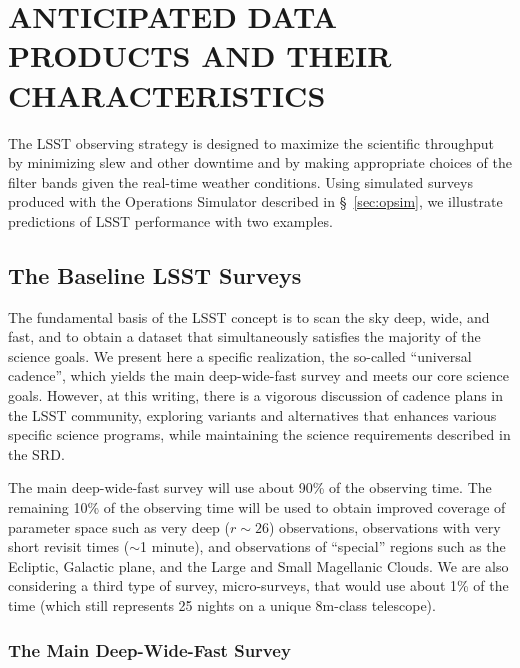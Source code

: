 \section{  ANTICIPATED DATA PRODUCTS AND THEIR CHARACTERISTICS    }
\label{Sec:dataprod}

The LSST observing strategy is designed to maximize the scientific
throughput by minimizing slew and other downtime and by making appropriate
choices of the filter bands given the real-time weather conditions.
Using simulated surveys produced with the Operations Simulator described in \S~\ref{sec:opsim},
we illustrate predictions of LSST performance with two examples.


\subsection{ The Baseline LSST Surveys }
\label{sec:baseline}

The fundamental basis of the LSST concept is to scan the sky deep, wide, and
fast, and to obtain a dataset that simultaneously satisfies the majority
of the science goals. We present here a specific realization, the
so-called ``universal cadence'', which yields the main deep-wide-fast
survey and meets our core science goals.  However, at this writing,
there is a vigorous discussion of cadence plans in the LSST community,
exploring variants and alternatives that enhances various specific
science programs, while maintaining the science requirements described
in the SRD.

The main deep-wide-fast survey %
will use about 90\% of the observing time. The remaining 10\% of the observing
time will be used to obtain improved coverage of parameter space such as
very deep ($r\sim26$) observations, observations with very short revisit
times ($\sim$1 minute), and observations of ``special'' regions such as the
Ecliptic, Galactic plane, and the Large and Small Magellanic Clouds.
We are also considering a third type of survey, micro-surveys, that would
use about 1\% of the time (which still represents 25 nights on a unique
8m-class telescope).

\subsubsection{ The Main Deep-Wide-Fast Survey }


